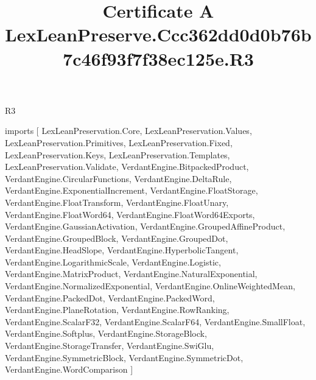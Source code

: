 \begin{lexlean}{R3}
\title{Certificate A LexLeanPreserve.Ccc362dd0d0b76b7c46f93f7f38ec125e.R3}
\begin{coremodule}
imports [
  LexLeanPreservation.Core,
  LexLeanPreservation.Values,
  LexLeanPreservation.Primitives,
  LexLeanPreservation.Fixed,
  LexLeanPreservation.Keys,
  LexLeanPreservation.Templates,
  LexLeanPreservation.Validate,
  VerdantEngine.BitpackedProduct,
  VerdantEngine.CircularFunctions,
  VerdantEngine.DeltaRule,
  VerdantEngine.ExponentialIncrement,
  VerdantEngine.FloatStorage,
  VerdantEngine.FloatTransform,
  VerdantEngine.FloatUnary,
  VerdantEngine.FloatWord64,
  VerdantEngine.FloatWord64Exports,
  VerdantEngine.GaussianActivation,
  VerdantEngine.GroupedAffineProduct,
  VerdantEngine.GroupedBlock,
  VerdantEngine.GroupedDot,
  VerdantEngine.HeadSlope,
  VerdantEngine.HyperbolicTangent,
  VerdantEngine.LogarithmicScale,
  VerdantEngine.Logistic,
  VerdantEngine.MatrixProduct,
  VerdantEngine.NaturalExponential,
  VerdantEngine.NormalizedExponential,
  VerdantEngine.OnlineWeightedMean,
  VerdantEngine.PackedDot,
  VerdantEngine.PackedWord,
  VerdantEngine.PlaneRotation,
  VerdantEngine.RowRanking,
  VerdantEngine.ScalarF32,
  VerdantEngine.ScalarF64,
  VerdantEngine.SmallFloat,
  VerdantEngine.Softplus,
  VerdantEngine.StorageBlock,
  VerdantEngine.StorageTransfer,
  VerdantEngine.SwiGlu,
  VerdantEngine.SymmetricBlock,
  VerdantEngine.SymmetricDot,
  VerdantEngine.WordComparison
]


\end{coremodule}
\end{lexlean}
